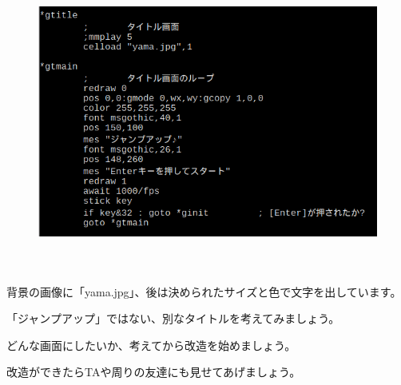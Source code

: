 \begin{figure}[H]
    \begin{center}
      \includegraphics[keepaspectratio,width=14.42cm,height=9.791cm]{text04-img/s_jumptitlesrc.png}
    \end{center}
    \label{fig:prog_menu}
\end{figure}


\begin{description}
    \item {}
\end{description}

背景の画像に「yama.jpg」、後は決められたサイズと色で文字を出しています。

「ジャンプアップ」ではない、別なタイトルを考えてみましょう。

どんな画面にしたいか、考えてから改造を始めましょう。

改造ができたらTAや周りの友達にも見せてあげましょう。




